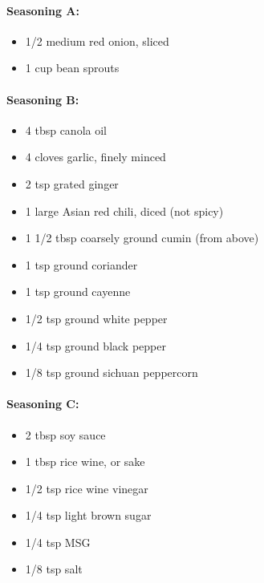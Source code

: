 \documentclass[
]{article}
\providecommand{\tightlist}{%
  \setlength{\itemsep}{0pt}\setlength{\parskip}{0pt}}
\begin{document}
\hypertarget{seasoning-a}{%
\paragraph{Seasoning A:}\label{seasoning-a}}

\begin{itemize}
\tightlist
\item
  1/2 medium red onion, sliced
\item
  1 cup bean sprouts
\end{itemize}

\hypertarget{seasoning-b}{%
\paragraph{Seasoning B:}\label{seasoning-b}}

\begin{itemize}
\tightlist
\item
  4 tbsp canola oil
\item
  4 cloves garlic, finely minced
\item
  2 tsp grated ginger
\item
  1 large Asian red chili, diced (not spicy)
\item
  1 1/2 tbsp coarsely ground cumin (from above)
\item
  1 tsp ground coriander
\item
  1 tsp ground cayenne
\item
  1/2 tsp ground white pepper
\item
  1/4 tsp ground black pepper
\item
  1/8 tsp ground sichuan peppercorn
\end{itemize}

\hypertarget{seasoning-c}{%
\paragraph{Seasoning C:}\label{seasoning-c}}

\begin{itemize}
\tightlist
\item
  2 tbsp soy sauce
\item
  1 tbsp rice wine, or sake
\item
  1/2 tsp rice wine vinegar
\item
  1/4 tsp light brown sugar
\item
  1/4 tsp MSG
\item
  1/8 tsp salt
\end{itemize}
\end{document}
